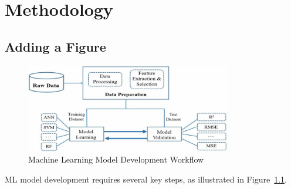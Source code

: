 \chapter{Methodology}

\section{Adding a Figure}


\begin{figure}[H]
    \centering
    \includegraphics[width=0.8\textwidth]{Figures/Fig:ML-workflow.png}
    \caption{Machine Learning Model Development Workflow}
    \label{fig:ml-workflow}
\end{figure}





ML model development requires several key steps, as illustrated in Figure~\ref{fig:ml-workflow}.